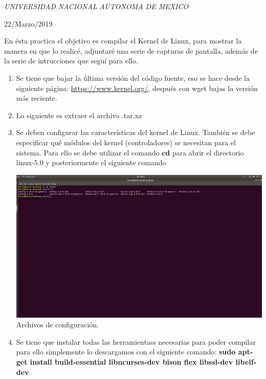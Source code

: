 \documentclass[a4paper, 11pt, oneside]{article}
\begin{document}
\begin{titlepage}
	\textit{UNIVERSIDAD NACIONAL AUTONOMA DE MEXICO} 
	
	\vfill
	
	
	
	
	\vspace{0.3\baselineskip} 
	
	22/Marzo/2019 
	
	 

\end{titlepage}

En ésta practica el objetivo es compilar el Kernel de Linux, para mostrar la manera en que lo realicé, adjuntaré una serie de capturas de pantalla, además de la serie de intrucciones que seguí para ello.

\begin{enumerate}
    \item Se tiene que bajar la última versión del código fuente, eso se hace desde la siguiente página: \url{https://www.kernel.org/}, después con wget bajas la versión más reciente.
    \item Lo siguiente es extraer el archivo .tar.xz
    \item Se deben configurar las características del kernel de Linux. También se debe especificar qué módulos del kernel (controladores) se necesitan para el sistema. Para ello se debe utilizar el comando \textbf{cd} para abrir el directorio linux-5.0 y posteriormente el siguiente comando 
    \begin{center}
        \includegraphics[scale=0.18]{config.png}
        Archivos de configuración.
    \end{center}
    \item Se tiene que instalar todas las herramientass necesarias para poder compilar para ello simplemente lo descargamos con el siguiente comando: \textbf{sudo apt-get install build-essential libncurses-dev bison flex libssl-dev libelf-dev}

\end{enumerate}
\end{document}

